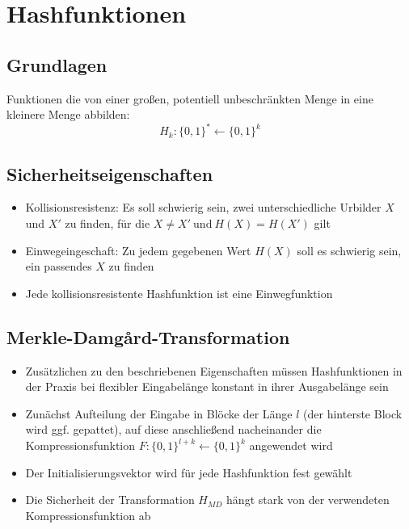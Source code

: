 \section{Hashfunktionen}

\subsection{Grundlagen}
Funktionen die von einer großen, potentiell unbeschränkten Menge in eine kleinere Menge abbilden:
\[H_k : \{0,1\}^* \leftarrow \{0,1\}^k\]


\subsection{Sicherheitseigenschaften}
\begin{itemize}
	\item Kollisionsresistenz: Es soll schwierig sein, zwei unterschiedliche Urbilder \(X\) und \(X'\) zu finden, für die \(X \neq X'~\text{und}~H(X) = H(X')\) gilt
	\item Einwegeingeschaft: Zu jedem gegebenen Wert \(H(X)\) soll es schwierig sein, ein passendes \(X\) zu finden
	\item Jede kollisionsresistente Hashfunktion ist eine Einwegfunktion
\end{itemize}


\subsection{Merkle-Damg\r{a}rd-Transformation}
\begin{itemize}
	\item Zusätzlichen zu den beschriebenen Eigenschaften müssen Hashfunktionen in der Praxis bei flexibler Eingabelänge konstant in ihrer Ausgabelänge sein
	\item Zunächst Aufteilung der Eingabe in Blöcke der Länge \(l\) (der hinterste Block wird ggf. gepattet), auf diese anschließend nacheinander die Kompressionsfunktion \(F: \{0,1\}^{l+k} \leftarrow \{0,1\}^k\) angewendet wird
	\item Der Initialisierungsvektor wird für jede Hashfunktion fest gewählt
	\item Die Sicherheit der Transformation \(H_{MD}\) hängt stark von der verwendeten Kompressionsfunktion ab
\end{itemize}

